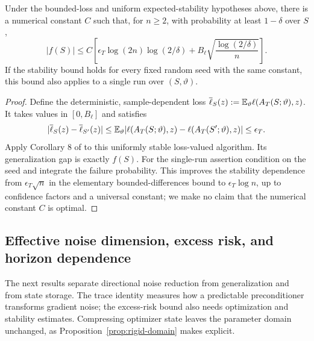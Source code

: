 \begin{corollary}\label{cor:sharp-stability-tail}
Under the bounded-loss and uniform expected-stability hypotheses above, there
is a numerical constant $C$ such that, for $n\ge2$, with probability at least
$1-\delta$ over $S$,
\begin{equation}
 |f(S)|\le C\left[
 \epsilon_T\log(2n)\log(2/\delta)
       +B_\ell\sqrt{\frac{\log(2/\delta)}n}\right].
\end{equation}
If the stability bound holds for every fixed random seed with the same
constant, this bound also applies to a single run over $(S,\vartheta)$.
\end{corollary}
\begin{proof}
Define the deterministic, sample-dependent loss
$\overline\ell_S(z):=\mathbb E_\vartheta\ell(A_T(S;\vartheta),z)$.
It takes values in $[0,B_\ell]$ and satisfies
\begin{equation}
 |\overline\ell_S(z)-\overline\ell_{S'}(z)|
 \le\mathbb E_\vartheta|\ell(A_T(S;\vartheta),z)-\ell(A_T(S';\vartheta),z)|
 \le\epsilon_T.
\end{equation}
Apply Corollary 8 of \citet{bousquet2020sharper} to this uniformly stable
loss-valued algorithm. Its generalization gap is exactly $f(S)$. For the
single-run assertion condition on the seed and integrate the failure
probability. This improves the stability dependence from
$\epsilon_T\sqrt n$ in the elementary bounded-differences bound to
$\epsilon_T\log n$, up to confidence factors and a universal constant;
we make no claim that the numerical constant $C$ is optimal.
\end{proof}

\subsection{Effective noise dimension, excess risk, and horizon dependence}
The next results separate directional noise reduction from generalization and
from state storage. The trace identity measures how a predictable
preconditioner transforms gradient noise; the excess-risk bound also needs
optimization and stability estimates. Compressing optimizer state leaves the
parameter domain unchanged, as Proposition~\ref{prop:rigid-domain} makes explicit.

